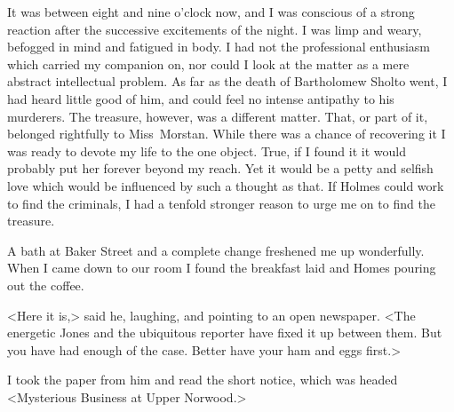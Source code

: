 It was between eight and nine o'clock now, and I was conscious of a strong reaction after the successive excitements of the night. I was limp and weary, befogged in mind and fatigued in body. I had not the professional enthusiasm which carried my companion on, nor could I look at the matter as a mere abstract intellectual problem. As far as the death of Bartholomew Sholto went, I had heard little good of him, and could feel no intense antipathy to his murderers. The treasure, however, was a different matter. That, or part of it, belonged rightfully to Miss~Morstan. While there was a chance of recovering it I was ready to devote my life to the one object. True, if I found it it would probably put her forever beyond my reach. Yet it would be a petty and selfish love which would be influenced by such a thought as that. If Holmes could work to find the criminals, I had a tenfold stronger reason to urge me on to find the treasure.

A bath at Baker Street and a complete change freshened me up wonderfully. When I came down to our room I found the breakfast laid and Homes pouring out the coffee.

<Here it is,> said he, laughing, and pointing to an open newspaper. <The energetic Jones and the ubiquitous reporter have fixed it up between them. But you have had enough of the case. Better have your ham and eggs first.>

I took the paper from him and read the short notice, which was headed <Mysterious Business at Upper Norwood.>

